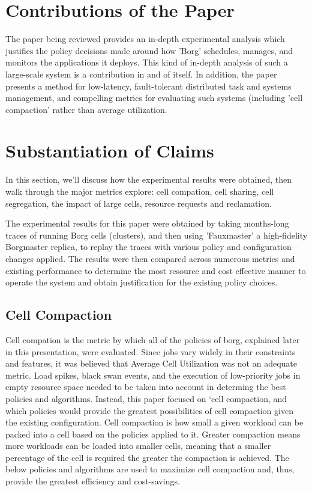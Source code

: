 \documentclass[runningheads,a4paper]{llncs}
\begin{document}
\section{Contributions of the Paper}
The paper being reviewed provides an in-depth experimental analysis which justifies the policy decisions made around how 'Borg' schedules, manages, and monitors the applications it deploys.  This kind of in-depth analysis of such a large-scale system is a contribution in and of itself.  In addition, the paper presents a method for low-latency, fault-tolerant distributed task and systems management, and compelling metrics for evaluating such systems (including 'cell compaction' rather than average utilization.

\section{Substantiation of Claims}
In this section, we'll discuss how the experimental results were obtained,  then walk through the major metrics explore: cell compation, cell sharing, cell segregation,  the impact of large cells, resource requests and reclamation.  

The experimental results for this paper were obtained by taking months-long traces of running Borg cells (clusters), and then using 'Fauxmaster' a high-fidelity Borgmaster replica, to replay the traces with various policy and configuration changes applied.  The results were then compared across numerous metrics and existing performance to determine the most resource and cost effective manner to operate the system and obtain justification for the existing policy choices. 
 
\subsection{Cell Compaction} 
Cell compation is the metric by which all of the policies of borg, explained later in this presentation, were evaluated.  Since jobs vary widely in their constraints and features, it was believed that Average Cell Utilization was not an adequate metric.  Load spikes, black swan events, and the execution of low-priority jobs in empty resource space needed to be taken into account in determing the best policies and algorithms.  Instead, this paper focused on ‘cell compaction, and which policies would provide the greatest possibilities of cell compaction given the existing configuration.  Cell compaction is how small a given workload can be packed into a cell based on the policies applied to it.  Greater compaction means more workloads can be loaded into smaller cells, meaning that a smaller percentage of the cell is required the greater the compaction is achieved.  The below policies and algorithms are used to maximize cell compaction and, thus, provide the greatest efficiency and cost-savings.
\end{document}
